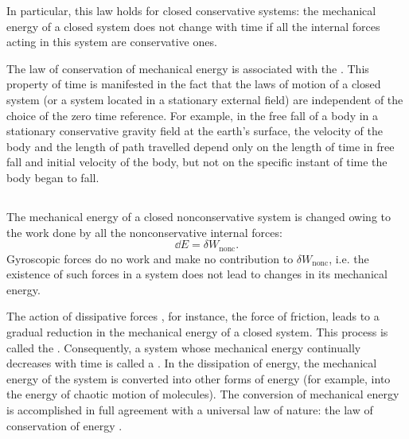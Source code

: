 In particular, this law holds for closed conservative systems: the mechanical energy of a closed system does not change with time if all the internal forces acting in this system are conser­vative ones.

The law of conservation of mechanical energy is associated with the . This property of time is manifested in the fact that the laws of motion of a closed system (or a system located in a stationary external field) are independent of the choice of the zero time reference. For example, in the free fall of a body in a stationary conservative gravity field at the earth's surface, the velocity of the body and the length of path travelled depend only on the length of time in free fall and initial vel­ocity of the body, but not on the specific instant of time the body began to fall.

\subsection{}\label{3.4.3} The mechanical energy of a closed nonconservative system is changed owing to the work done by all the nonconservative internal forces:
\begin{equation*}%
\dd E = \delta W_{\textrm{nonc}}.
\end{equation*}
Gyroscopic forces  do no work and make no contribution to $\delta W_{\textrm{nonc}}$, i.e. the existence of such forces in a system does not lead to changes in its mechanical energy.

The action of dissipative forces , for instance, the force of friction, leads to a gradual reduction in the mechanical energy of a closed system. This process is called the . Consequently, a system whose mechanical energy contin­ually decreases with time is called a . In the dissipation of energy, the mechanical energy of the system is converted into other forms of energy (for example, into the energy of chaotic motion of molecules). The conversion of mechanical energy is accomplished in full agreement with a universal law of nature: the law of conservation of energy .

